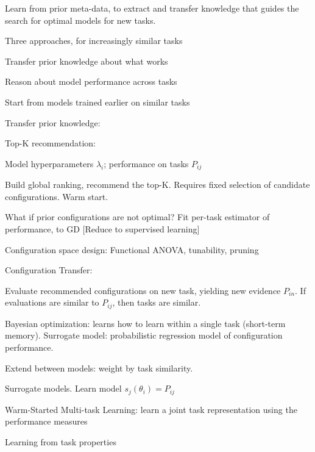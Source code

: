 \documentclass[english]{article}
\begin{document}
Learn from prior meta-data, to extract and transfer knowledge that guides the search for optimal models for new tasks.

\item Three approaches, for increasingly similar tasks


\benum 
\item Transfer prior knowledge about what works
\item Reason about model performance across tasks
\item Start from models trained earlier on similar tasks
\eenum

\item Transfer prior knowledge: 

\benum 
\item Top-K recommendation:
\item Model hyperparameters $\lambda_i$; performance on tasks $P_{ij}$
\item Build global ranking, recommend the top-K. Requires fixed selection of candidate configurations. Warm start.

\item What if prior configurations are not optimal? Fit per-task estimator of performance, to GD [Reduce to supervised learning]

\item Configuration space design: Functional ANOVA, tunability, pruning

\item Configuration Transfer: 

Evaluate recommended configurations on new task, yielding new evidence $P_{in}$. If evaluations are similar to $P_{ij}$, then tasks are similar.

\item Bayesian optimization: learns how to learn within a single task (short-term memory). Surrogate model: probabilistic regression model of configuration performance. 

Extend between models: weight by task similarity. 

\item Surrogate models. Learn model $s_j(\theta_i)=P_{ij}$

\item Warm-Started Multi-task Learning: learn a joint task representation using the performance measures


\eenum

\item Learning from task properties
\end{document}
